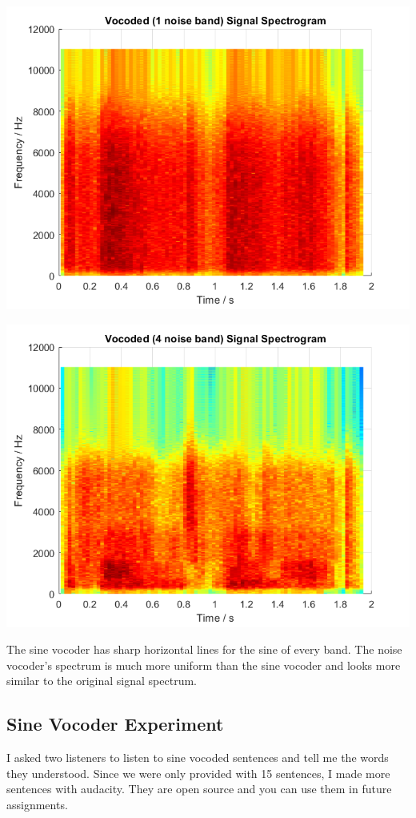 \documentclass[11pt]{article}
\begin{document}
\includegraphics[height=0.4\textheight]{output/vocoded_1noise_spectrogram.png}

\includegraphics[height=0.4\textheight]{output/vocoded_4noise_spectrogram.png}

The sine vocoder has sharp horizontal lines for the sine of every band.
The noise vocoder's spectrum is much more uniform than the sine vocoder and looks more
similar to the original signal spectrum.

\pagebreak
\subsection{Sine Vocoder Experiment}

I asked two listeners to listen to sine vocoded sentences and tell
me the words they understood.
Since we were only provided with 15 sentences, I made more sentences with audacity.
They are open source and you can use them in future assignments.\\
\end{document}
